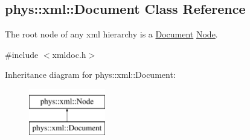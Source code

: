 \hypertarget{classphys_1_1xml_1_1Document}{
\subsection{phys::xml::Document Class Reference}
\label{dd/d44/classphys_1_1xml_1_1Document}
}


The root node of any xml hierarchy is a \hyperlink{classphys_1_1xml_1_1Document}{Document} \hyperlink{classphys_1_1xml_1_1Node}{Node}.  




{\ttfamily \#include $<$xmldoc.h$>$}

Inheritance diagram for phys::xml::Document:\begin{figure}[H]
\begin{center}
\leavevmode
\includegraphics[height=2.000000cm]{dd/d44/classphys_1_1xml_1_1Document}
\end{center}
\end{figure}
